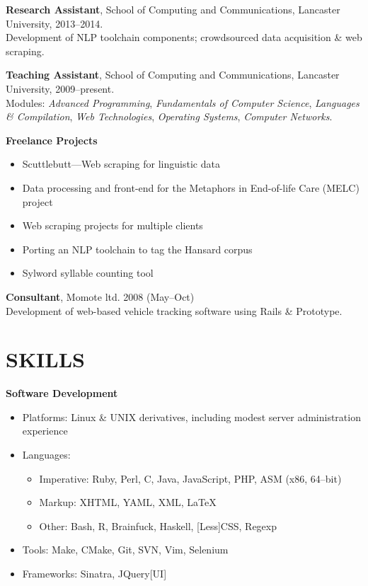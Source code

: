 \documentclass{res}
\begin{document}
\begin{resume}
    {\bf Research Assistant},
    School of Computing and Communications,
    Lancaster University,
    2013--2014.\\
    Development of NLP toolchain components; crowdsourced data acquisition \& web scraping.

    {\bf Teaching Assistant},
    School of Computing and Communications,
    Lancaster University,
    2009--present.\\
    Modules: \textsl{Advanced Programming}, \textsl{Fundamentals of Computer Science}, \textsl{Languages \& Compilation}, \textsl{Web Technologies}, \textsl{Operating Systems}, \textsl{Computer Networks}.

    {\bf Freelance Projects}
    \begin{itemize}
        \item Scuttlebutt---Web scraping for linguistic data
        \item Data processing and front-end for the Metaphors in End-of-life Care (MELC) project
        \item Web scraping projects for multiple clients
        \item Porting an NLP toolchain to tag the Hansard corpus
        \item Sylword syllable counting tool
    \end{itemize}

    {\bf Consultant},
    Momote ltd.
    2008 (May--Oct)\\
    Development of web-based vehicle tracking software using Rails \& Prototype.




\section{SKILLS}
\vspace{0.1in}

   {\bf Software Development}
        \begin{itemize}
            \item[] Platforms: Linux \& UNIX derivatives, including modest server administration experience
            \item[] Languages:
                \begin{itemize}
                    \item Imperative: Ruby, Perl, C, Java, JavaScript, PHP, ASM (x86, 64--bit)
                    \item Markup: XHTML, YAML, XML, \LaTeX
                    \item Other: Bash, R, Brainfuck, Haskell, [Less]CSS, Regexp
                \end{itemize}
            \item[] Tools: Make, CMake, Git, SVN, Vim, Selenium
            \item[] Frameworks: Sinatra, JQuery[UI]
        \end{itemize}


\end{resume}
\end{document}
